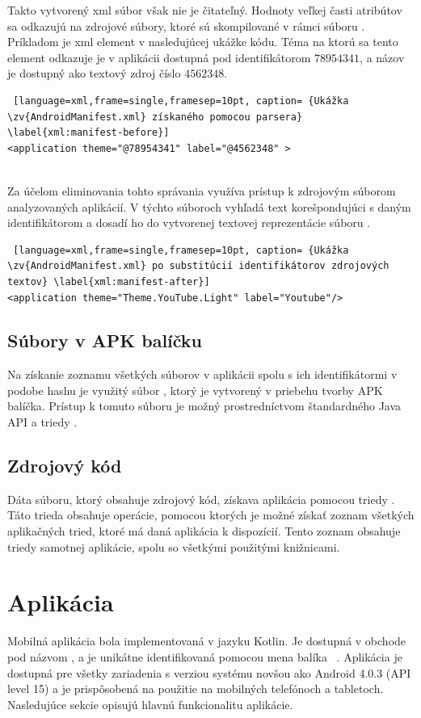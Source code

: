 Takto vytvorený xml súbor však nie je čitateľný. Hodnoty veľkej časti atribútov sa odkazujú na zdrojové súbory, ktoré sú skompilované v rámci súboru . Príkladom je xml element  v nasledujúcej ukážke kódu. Téma na ktorú sa tento element odkazuje je v aplikácii dostupná pod identifikátorom $78954341$, a názov je dostupný ako textový zdroj číslo $4562348$.
\mbox{}\\
\begin{lstlisting} [language=xml,frame=single,framesep=10pt, caption= {Ukážka \zv{AndroidManifest.xml} získaného pomocou parsera} \label{xml:manifest-before}]
<application theme="@78954341" label="@4562348" >
\end{lstlisting}
\mbox{}\\
Za účelom eliminovania tohto správania využíva  prístup k zdrojovým súborom analyzovaných aplikácií. V týchto súboroch vyhľadá text korešpondujúci s daným identifikátorom a dosadí ho do vytvorenej textovej reprezentácie súboru .
\mbox{}\\
\begin{lstlisting} [language=xml,frame=single,framesep=10pt, caption= {Ukážka \zv{AndroidManifest.xml} po substitúcií identifikátorov zdrojových textov} \label{xml:manifest-after}]
<application theme="Theme.YouTube.Light" label="Youtube"/>
\end{lstlisting}

\subsection{Súbory v APK balíčku}
Na získanie zoznamu všetkých súborov v aplikácii spolu s ich identifikátormi v podobe hashu je využitý súbor , ktorý je vytvorený v priebehu tvorby APK balíčka.  Prístup k tomuto súboru je možný prostredníctvom štandardného Java API a triedy .

\subsection{Zdrojový kód}
Dáta  súboru, ktorý obsahuje zdrojový kód, získava aplikácia pomocou triedy . Táto trieda obsahuje operácie, pomocou ktorých je možné získať zoznam všetkých aplikačných tried, ktoré má daná aplikácia k dispozícií. Tento zoznam obsahuje triedy samotnej aplikácie, spolu so všetkými použitými knižnicami. 

\section{Aplikácia}
Mobilná aplikácia bola implementovaná v jazyku Kotlin. Je dostupná v obchode  pod názvom , a je unikátne identifikovaná pomocou mena balíka ~\cite{gp}. Aplikácia je dostupná pre všetky zariadenia s verziou systému novšou ako Android 4.0.3 (API level 15) a  je prispôsobená na použitie na mobilných telefónoch a tabletoch. Nasledujúce sekcie opisujú hlavnú funkcionalitu aplikácie.

